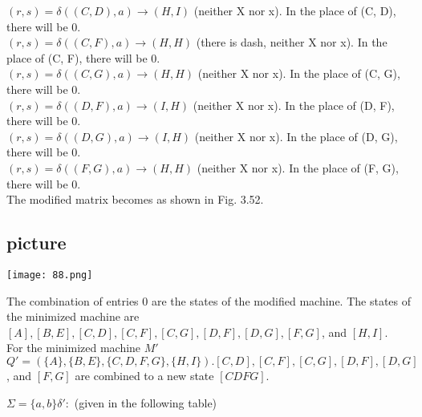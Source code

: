 \documentclass{article}
\begin{document}
\vspace*{0.1cm}
\hspace*{0.4cm} $(r, s) = \delta((C, D), a) \rightarrow (H, I)$ (neither X nor x). In the place of (C, D), there will be 0.\\

\hspace*{0.4cm} $(r, s) = \delta((C, F), a) \rightarrow (H, H)$ (there is dash, neither X nor x). In the place of (C, F), there will be 0.\\
\hspace*{0.4cm} $(r, s) = \delta((C, G), a) \rightarrow (H, H)$ (neither X nor x). In the place of (C, G), there will be 0.\\
\hspace*{0.4cm} $(r, s) = \delta((D, F), a) \rightarrow (I, H)$ (neither X nor x). In the place of (D, F), there will be 0.\\
\hspace*{0.4cm} $(r, s) = \delta((D, G), a) \rightarrow (I, H)$ (neither X nor x). In the place of (D, G), there will be 0.\\
\hspace*{0.4cm} $(r, s) = \delta((F, G), a) \rightarrow (H, H)$ (neither X nor x). In the place of (F, G), there will be 0.\\

\hspace*{0.4cm} The modified matrix becomes as shown in Fig. 3.52.\\
\begin{center}
\section{picture}
\texttt{[image: 88.png]}
\end{center}

The combination of entries 0 are the states of the modified machine. The states of the minimized
machine are $[A], [B, E], [C, D], [C, F], [C, G], [D, F], [D, G], [F, G]$, and $[H, I]$.\\
\hspace*{0.4cm} For the minimized machine $M'$\\
\hspace*{0.4cm} $Q' = (\{A\}, \{B, E\}, \{C, D, F, G\}, \{H, I\}). [C, D], [C, F], [C, G], [D, F], [D, G]$, and $[F, G]$ are
combined to a new state $[CDFG]$.\\

\begin{center}
  $\Sigma = \{a, b\} \delta':$ (given in the following table)
\end{center}
\end{document}
